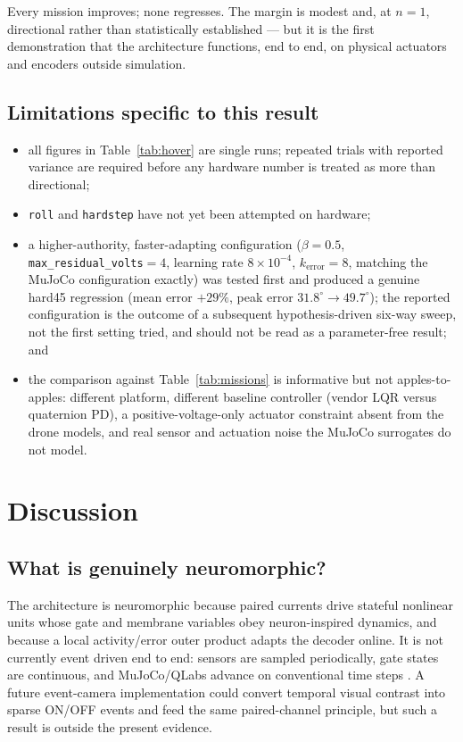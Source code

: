 \documentclass[10pt,twocolumn]{article}
\begin{document}
Every mission improves; none regresses. The margin is modest and, at $n=1$,
directional rather than statistically established --- but it is the first
demonstration that the architecture functions, end to end, on physical
actuators and encoders outside simulation.

\subsection{Limitations specific to this result}
\label{sec:hover-limits}

\begin{itemize}
    \item all figures in Table~\ref{tab:hover} are single runs; repeated
    trials with reported variance are required before any hardware number is
    treated as more than directional;
    \item \texttt{roll} and \texttt{hardstep} have not yet been attempted on
    hardware;
    \item a higher-authority, faster-adapting configuration ($\beta=0.5$,
    \texttt{max\_residual\_volts}$=4$, learning rate $8\times10^{-4}$,
    $k_{\mathrm{error}}=8$, matching the MuJoCo configuration exactly) was
    tested first and produced a genuine hard45 regression (mean error
    $+29\%$, peak error $31.8^\circ\rightarrow49.7^\circ$); the reported
    configuration is the outcome of a subsequent hypothesis-driven six-way
    sweep, not the first setting tried, and should not be read as a
    parameter-free result; and
    \item the comparison against Table~\ref{tab:missions} is informative but
    not apples-to-apples: different platform, different baseline
    controller (vendor LQR versus quaternion PD), a positive-voltage-only
    actuator constraint absent from the drone models, and real sensor and
    actuation noise the MuJoCo surrogates do not model.
\end{itemize}

\section{Discussion}

\subsection{What is genuinely neuromorphic?}

The architecture is neuromorphic because paired currents drive stateful
nonlinear units whose gate and membrane variables obey neuron-inspired dynamics,
and because a local activity/error outer product adapts the decoder online. It
is not currently event driven end to end: sensors are sampled periodically,
gate states are continuous, and MuJoCo/QLabs advance on conventional time
steps \cite{pedersen2024nir,nourse2023sns}. A future event-camera implementation could convert temporal visual
contrast into sparse ON/OFF events and feed the same paired-channel principle,
but such a result is outside the present evidence.
\end{document}
